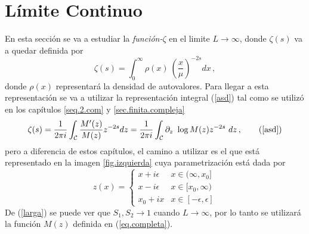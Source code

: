\chapter{Límite Continuo}

En esta sección se va a estudiar la {\it función-$\zeta $} en el limite $L \rightarrow \infty$, donde $\zeta  (s)$ va a quedar definida por
\begin{equation}
	\zeta (s) = \int _{0} ^{\infty} \rho (x) \ \left( \frac{x}{\mu } 			\right) ^{-2 s} dx
\, ,	
\label{eq.zeta.continuo}
\end{equation}
donde $\rho(x) $ representará la densidad de autovalores. Para llegar a esta representación se va a utilizar la representación integral (\ref{asd}) tal como se utilizó en los capítulos \ref{seq.2.com} y  \ref{sec.finita.compleja}
\begin{equation}
\zeta (s) = 
\frac{1}{2 \pi i} 
\int _{\mathcal{C}}
\frac{M ' ( z ) }{ M ( z ) } z ^{-2s} d z = 
\frac{1}{2 \pi i} 
\int _{\mathcal{C}}
\partial _z \ \log 	M(z)  z ^{-2s} \ dz
	\, ,
	\tag{\ref{asd}}
\end{equation}
pero a diferencia de estos capítulos, el camino a utilizar es el que está representado en la imagen \ref{fig.izquierda} cuya parametrización está dada por 
\begin{equation}
z(x) =  
	  \begin{cases} 
      x + i \epsilon  &  x \in ( \infty, x_0] \\
      x - i \epsilon  &  x \in  [ x_0, \infty) \\
      x _0 + i x	  &  x \in [-\epsilon,\epsilon]
   \end{cases}
\label{eq.para.con}
\end{equation}
De (\ref{larga}) se puede ver que $S _1,S _2 \rightarrow 1$ cuando $L \rightarrow \infty$, por lo tanto se utilizará la función $M (z)$ definida en (\ref{eq.completa}).


